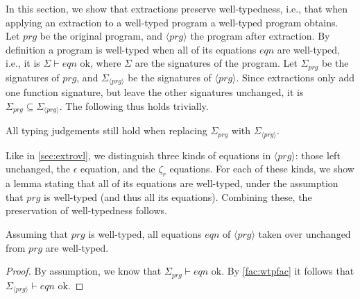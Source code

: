 In this section, we show that extractions preserve well-typedness, i.e., that when applying an extraction to a well-typed program a well-typed program obtains. Let $prg$ be the original program, and $\langle prg \rangle$ the program after extraction. By definition a program is well-typed when all of its equations $eqn$ are well-typed, i.e., it is $\Sigma \vdash eqn \textrm{ ok}$, where $\Sigma$ are the signatures of the program. Let $\Sigma_{prg}$ be the signatures of $prg$, and $\Sigma_{\langle prg \rangle}$ be the signatures of $\langle prg \rangle$. Since extractions only add one function signature, but leave the other signatures unchanged, it is $\Sigma_{prg} \subseteq \Sigma_{\langle prg \rangle}$. The following thus holds trivially.

\begin{fact}
\label{fac:wtpfac}
All typing judgements still hold when replacing $\Sigma_{prg}$ with $\Sigma_{\langle prg \rangle}$.
\end{fact}

Like in \autoref{sec:extrovl}, we distinguish three kinds of equations in $\langle prg \rangle$: those left unchanged, the $\epsilon$ equation, and the $\zeta_r$ equations. For each of these kinds, we show a lemma stating that all of its equations are well-typed, under the assumption that $prg$  is well-typed (and thus all its equations). Combining these, the preservation of well-typedness follows.

\begin{lemma}
Assuming that $prg$ is well-typed, all equations $eqn$ of $\langle prg \rangle$ taken over unchanged from $prg$ are well-typed.

\begin{proof}
By assumption, we know that $\Sigma_{prg} \vdash eqn \textrm{ ok}$. By \autoref{fac:wtpfac} it follows that $\Sigma_{\langle prg \rangle} \vdash eqn \textrm{ ok}$.
\end{proof}
\end{lemma}

